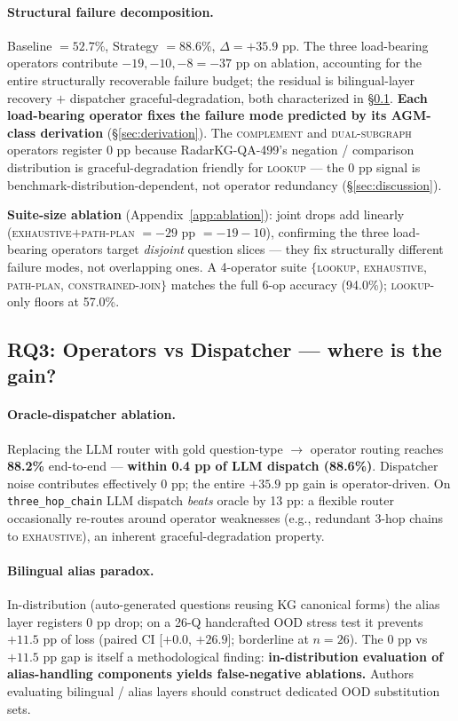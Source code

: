 \documentclass[review]{elsarticle}
\newcommand{\qtype}[1]{\texttt{\small #1}}
\newcommand{\op}[1]{\textsc{\small #1}}
\begin{document}
\paragraph{Structural failure decomposition.}
Baseline $= 52.7\%$, Strategy $= 88.6\%$, $\Delta=+35.9$ pp. The three load-bearing operators contribute $-19, -10, -8 = -37$ pp on ablation, accounting for the entire structurally recoverable failure budget; the residual is bilingual-layer recovery $+$ dispatcher graceful-degradation, both characterized in §\ref{sec:rq3}. \textbf{Each load-bearing operator fixes the failure mode predicted by its AGM-class derivation} (§\ref{sec:derivation}). The \op{complement} and \op{dual-subgraph} operators register 0 pp because RadarKG-QA-499's negation / comparison distribution is graceful-degradation friendly for \op{lookup} --- the 0 pp signal is benchmark-distribution-dependent, not operator redundancy (§\ref{sec:discussion}).

\textbf{Suite-size ablation} (Appendix~\ref{app:ablation}): joint drops add linearly (\op{exhaustive}$+$\op{path-plan} $= -29$ pp $= -19{-}10$), confirming the three load-bearing operators target \emph{disjoint} question slices --- they fix structurally different failure modes, not overlapping ones. A 4-operator suite $\{$\op{lookup}, \op{exhaustive}, \op{path-plan}, \op{constrained-join}$\}$ matches the full 6-op accuracy (94.0\%); \op{lookup}-only floors at 57.0\%.

\subsection{RQ3: Operators vs Dispatcher --- where is the gain?}
\label{sec:rq3}

\paragraph{Oracle-dispatcher ablation.}
Replacing the LLM router with gold question-type $\to$ operator routing reaches \textbf{88.2\%} end-to-end --- \textbf{within 0.4 pp of LLM dispatch (88.6\%)}. Dispatcher noise contributes effectively 0 pp; the entire $+35.9$ pp gain is operator-driven. On \qtype{three\_hop\_chain} LLM dispatch \emph{beats} oracle by 13 pp: a flexible router occasionally re-routes around operator weaknesses (e.g., redundant 3-hop chains to \op{exhaustive}), an inherent graceful-degradation property.

\paragraph{Bilingual alias paradox.}
In-distribution (auto-generated questions reusing KG canonical forms) the alias layer registers 0 pp drop; on a 26-Q handcrafted OOD stress test it prevents $+11.5$ pp of loss (paired CI [$+0.0$, $+26.9$]; borderline at $n\!=\!26$). The 0 pp vs $+11.5$ pp gap is itself a methodological finding: \textbf{in-distribution evaluation of alias-handling components yields false-negative ablations.} Authors evaluating bilingual / alias layers should construct dedicated OOD substitution sets.
\end{document}
